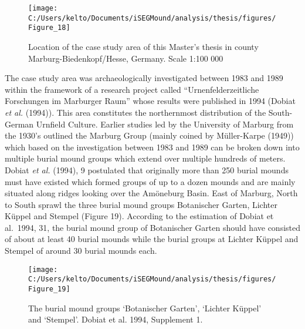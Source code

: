 \documentclass[
  12pt,
]{article}
\begin{document}
\begin{figure}

{\centering \texttt{[image: C:/Users/kelto/Documents/iSEGMound/analysis/thesis/figures/Figure\_18]} 

}

\caption{Location of the case study area of this Master's thesis in county Marburg-Biedenkopf/Hesse, Germany. Scale 1:100 000}\label{fig:Figure18}
\end{figure}

The case study area was archaeologically investigated between 1983 and 1989 within the framework of a research project called ``Urnenfelderzeitliche Forschungen im Marburger Raum'' whose results were published in 1994 (Dobiat \emph{et al.} (1994)). This area constitutes the northernmost distribution of the South-German Urnfield Culture. Earlier studies led by the University of Marburg from the 1930's outlined the Marburg Group (mainly coined by Müller-Karpe (1949)) which based on the investigation between 1983 and 1989 can be broken down into multiple burial mound groups which extend over multiple hundreds of meters. Dobiat \emph{et al.} (1994), 9 postulated that originally more than 250 burial mounds must have existed which formed groups of up to a dozen mounds and are mainly situated along ridges looking over the Amöneburg Basin. East of Marburg, North to South sprawl the three burial mound groups Botanischer Garten, Lichter Küppel and Stempel (Figure 19). According to the estimation of Dobiat et al.~1994, 31, the burial mound group of Botanischer Garten should have consisted of about at least 40 burial mounds while the burial groups at Lichter Küppel and Stempel of around 30 burial mounds each.

\begin{figure}

{\centering \texttt{[image: C:/Users/kelto/Documents/iSEGMound/analysis/thesis/figures/Figure\_19]} 

}

\caption{The burial mound groups ‘Botanischer Garten’, ‘Lichter Küppel’ and ‘Stempel’. Dobiat et al. 1994, Supplement 1.}\label{fig:Figure19}
\end{figure}
\end{document}
